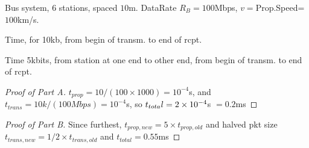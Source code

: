 \documentclass[./answersheet.tex]{subfiles}
\begin{document}
\begin{wts}
    Bus system, $6$ stations, spaced $10$m. DataRate $R_B=100$Mbps, $v=$Prop.Speed=$100$km/s.
    \begin{enumalpha}
        \item Time, for 10kb, from begin of transm. to end of rcpt.
        \item Time 5kbits, from station at one end to other end,  from begin of transm. to end of rcpt.
    \end{enumalpha}
\end{wts}
\begin{proof}[Proof of Part A]
    $t_{prop}=10/(100\times 1000)=10^{-4}$s, and $t_{trans}=10k/(100Mbps)=10^{-4}$s, so $t_{tota}l=2\times 10^{-4}$s $=0.2$ms
\end{proof}
\begin{proof}[Proof of Part B]
    Since furthest, $t_{prop,new}=5\times t_{prop,old}$ and halved pkt size $t_{trans,new}=1/2\times t_{trans,old}$ and $t_{total}=0.55$ms
\end{proof}
\end{document}
